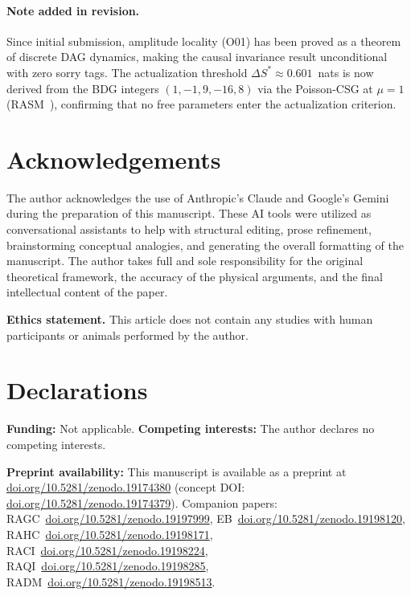 \documentclass[11pt,a4paper]{article}
\theoremstyle{plain}
\theoremstyle{definition}
\theoremstyle{remark}
\begin{document}
\paragraph{Note added in revision.}
Since initial submission, amplitude locality (O01) has been proved as a
theorem of discrete DAG dynamics, making the causal invariance result
unconditional with zero sorry tags. The actualization threshold
$\Delta S^* \approx 0.601$~nats is now derived from the BDG integers
$(1,-1,9,-16,8)$ via the Poisson-CSG at $\mu = 1$
(RASM~\cite{Sandeman2026RASM}), confirming that no free parameters
enter the actualization criterion.

\section*{Acknowledgements}
The author acknowledges the use of Anthropic's Claude and Google's Gemini during
the preparation of this manuscript. These AI tools were utilized as conversational
assistants to help with structural editing, prose refinement, brainstorming
conceptual analogies, and generating the overall formatting of the manuscript. The
author takes full and sole responsibility for the original theoretical framework,
the accuracy of the physical arguments, and the final intellectual content of the
paper.

\smallskip\noindent
\textbf{Ethics statement.}
This article does not contain any studies with human participants
or animals performed by the author.

\section*{Declarations}
\textbf{Funding:} Not applicable.\quad
\textbf{Competing interests:} The author declares no competing interests.

\textbf{Preprint availability:} This manuscript is available as a preprint at
\href{https://doi.org/10.5281/zenodo.19174380}{doi.org/10.5281/zenodo.19174380}
(concept DOI: \href{https://doi.org/10.5281/zenodo.19174379}{doi.org/10.5281/zenodo.19174379}).
Companion papers: RAGC~\href{https://doi.org/10.5281/zenodo.19197999}{doi.org/10.5281/zenodo.19197999}, EB~\href{https://doi.org/10.5281/zenodo.19198120}{doi.org/10.5281/zenodo.19198120}, RAHC~\href{https://doi.org/10.5281/zenodo.19198171}{doi.org/10.5281/zenodo.19198171}, RACI~\href{https://doi.org/10.5281/zenodo.19198224}{doi.org/10.5281/zenodo.19198224}, RAQI~\href{https://doi.org/10.5281/zenodo.19198285}{doi.org/10.5281/zenodo.19198285}, RADM~\href{https://doi.org/10.5281/zenodo.19198513}{doi.org/10.5281/zenodo.19198513}.
\end{document}
